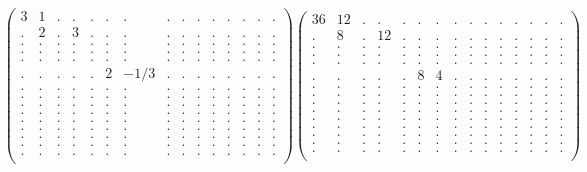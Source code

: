 \documentclass[12pt,a4paper]{amsart}
\begin{document}
\begin{align*}
\left(\begin{array}{rrrrrrrrrrrrrrr}%
3&1&.&.&.&.&.&.&.&.&.&.&.&.&.\\%
.&2&.&3&.&.&.&.&.&.&.&.&.&.&.\\%
.&.&.&.&.&.&.&.&.&.&.&.&.&.&.\\%
.&.&.&.&.&.&.&.&.&.&.&.&.&.&.\\%
.&.&.&.&.&.&.&.&.&.&.&.&.&.&.\\%
.&.&.&.&.&2&-1/3&.&.&.&.&.&.&.&.\\%
.&.&.&.&.&.&.&.&.&.&.&.&.&.&.\\%
.&.&.&.&.&.&.&.&.&.&.&.&.&.&.\\%
.&.&.&.&.&.&.&.&.&.&.&.&.&.&.\\%
.&.&.&.&.&.&.&.&.&.&.&.&.&.&.\\%
.&.&.&.&.&.&.&.&.&.&.&.&.&.&.\\%
.&.&.&.&.&.&.&.&.&.&.&.&.&.&.\\%
.&.&.&.&.&.&.&.&.&.&.&.&.&.&.\\%
.&.&.&.&.&.&.&.&.&.&.&.&.&.&.\\%
.&.&.&.&.&.&.&.&.&.&.&.&.&.&.\\%
\end{array}\right)%
\left(\begin{array}{rrrrrrrrrrrrrrr}%
36&12&.&.&.&.&.&.&.&.&.&.&.&.&.\\%
.&8&.&12&.&.&.&.&.&.&.&.&.&.&.\\%
.&.&.&.&.&.&.&.&.&.&.&.&.&.&.\\%
.&.&.&.&.&.&.&.&.&.&.&.&.&.&.\\%
.&.&.&.&.&.&.&.&.&.&.&.&.&.&.\\%
.&.&.&.&.&8&4&.&.&.&.&.&.&.&.\\%
.&.&.&.&.&.&.&.&.&.&.&.&.&.&.\\%
.&.&.&.&.&.&.&.&.&.&.&.&.&.&.\\%
.&.&.&.&.&.&.&.&.&.&.&.&.&.&.\\%
.&.&.&.&.&.&.&.&.&.&.&.&.&.&.\\%
.&.&.&.&.&.&.&.&.&.&.&.&.&.&.\\%
.&.&.&.&.&.&.&.&.&.&.&.&.&.&.\\%
.&.&.&.&.&.&.&.&.&.&.&.&.&.&.\\%
.&.&.&.&.&.&.&.&.&.&.&.&.&.&.\\%
.&.&.&.&.&.&.&.&.&.&.&.&.&.&.\\%
\end{array}\right)%
\end{align*}
\end{document}
